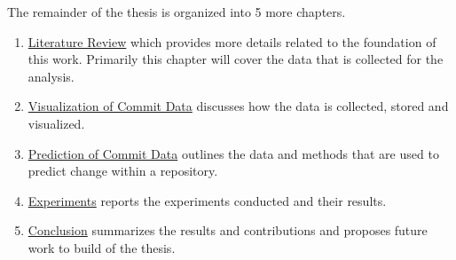 The remainder of the thesis is organized into 5 more chapters.

\begin{enumerate}
\item \hyperref[chap:related_works]{Literature Review} which provides more details related to the foundation of this work. Primarily this chapter will cover the data that is collected for the analysis.
\item \hyperref[chap:visualization]{Visualization of Commit Data} discusses how the data is collected, stored and visualized.
\item \hyperref[chap:prediction]{Prediction of Commit Data} outlines the data and methods that are used to predict change within a repository.
\item \hyperref[chap:experiments]{Experiments} reports the experiments conducted and their results.
\item \hyperref[chap:conclusions]{Conclusion} summarizes the results and contributions and proposes future work to build of the thesis.
\end{enumerate}

